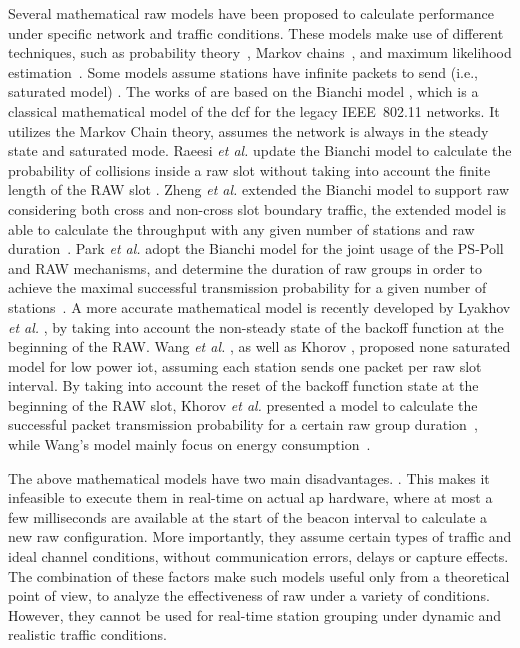 Several mathematical \gls{raw} models have been proposed to calculate  performance under specific network and traffic conditions. These models make use of different techniques, such as probability theory~\cite{Wang2015}, Markov chains~\cite{Raeesi2014a, Khorov2015b,Zheng2014, Evgeny2018, Khorov2015b, Park2014b}, and maximum likelihood estimation~\cite{Park2014b}. Some models  assume stations have infinite packets to send (i.e., saturated model)  \cite{Raeesi2014a, Zheng2014, Park2014b, Evgeny2018}. The works of \cite{Raeesi2014a, Zheng2014, Park2014b} are based on the Bianchi model \cite{bianchi2000performance}, which is a classical mathematical model of the \gls{dcf} for the legacy IEEE~802.11 networks. It utilizes the Markov Chain theory, assumes the network is always in the steady state and saturated mode. Raeesi \textit{et al.}  update the Bianchi model to calculate the probability of collisions inside a \gls{raw} slot without taking into account the finite length of the RAW slot \cite{Raeesi2014a}. Zheng \textit{et al.} extended the Bianchi model to support \gls{raw} considering both cross and non-cross slot boundary traffic, the extended model is able to calculate the throughput with any given number of stations and \gls{raw} duration~\cite{Zheng2014}. Park \textit{et al.} adopt the Bianchi model for the  joint usage of the PS-Poll and RAW mechanisms, and determine the duration of \gls{raw} groups in order to achieve the maximal successful transmission probability for a given number of stations~\cite{Park2014b}. A more accurate mathematical model is recently developed by Lyakhov \textit{et al.} \cite{Evgeny2018}, by taking into account the non-steady state of the backoff function at the beginning of the RAW. Wang \textit{et al.} \cite{Wang2015} , as well as Khorov \cite{Khorov2015b}, proposed none saturated model for low power \gls{iot}, assuming each station sends one packet per \gls{raw} slot interval. By taking into account the reset of the backoff function state at the beginning of the RAW slot, Khorov \textit{et al.} presented a model to calculate the successful packet transmission probability for a certain \gls{raw} group duration~\cite{Khorov2015b}, while Wang's model mainly focus on energy consumption~\cite{Wang2015}. 

The above mathematical models have two main disadvantages. . This makes it infeasible to execute them in real-time on actual \gls{ap} hardware, where at most a few milliseconds are available at the start of the beacon interval to calculate a new \gls{raw} configuration. More importantly, they assume certain types of traffic and ideal channel conditions, without communication errors, delays or capture effects. The combination of these factors make such models useful only from a theoretical point of view, to analyze the effectiveness of \gls{raw} under a variety of conditions. However, they cannot be used for real-time station grouping under dynamic and realistic traffic conditions. 

